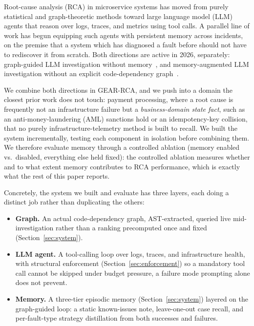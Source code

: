 \documentclass[conference]{IEEEtran}
\begin{document}
Root-cause analysis (RCA) in microservice systems has moved from purely statistical and graph-theoretic methods
toward large language model (LLM) agents that reason over logs, traces, and metrics using tool calls. A parallel
line of work has begun equipping such agents with persistent memory across incidents, on the premise that a
system which has diagnosed a fault before should not have to rediscover it from scratch. Both directions are
active in 2026, separately: graph-guided LLM investigation without memory~\cite{gala}, and memory-augmented LLM
investigation without an explicit code-dependency graph~\cite{amerrcl,opsmem}.

We combine both directions in GEAR-RCA, and we push into a domain the closest prior work does not touch:
payment processing, where a root cause is frequently not an infrastructure failure but a \emph{business-domain
state fact}, such as an anti-money-laundering (AML) sanctions hold or an idempotency-key collision, that no
purely infrastructure-telemetry method is built to recall. We built the system incrementally, testing each
component in isolation before combining them. We therefore evaluate memory through a controlled ablation
(memory enabled vs.\ disabled, everything else held fixed): the controlled ablation measures whether and to
what extent memory contributes to RCA performance, which is exactly what the rest of this paper reports.

Concretely, the system we built and evaluate has three layers, each doing a distinct job rather than
duplicating the others:
\label{sec:intro-arch}

\begin{itemize}
\item \textbf{Graph.} An actual code-dependency graph, AST-extracted, queried live mid-investigation rather than
a ranking precomputed once and fixed (Section~\ref{sec:system}).
\item \textbf{LLM agent.} A tool-calling loop over logs, traces, and infrastructure health, with structural
enforcement (Section~\ref{sec:enforcement}) so a mandatory tool call cannot be skipped under budget pressure, a
failure mode prompting alone does not prevent.
\item \textbf{Memory.} A three-tier episodic memory (Section~\ref{sec:system}) layered on the graph-guided loop:
a static known-issues note, leave-one-out case recall, and per-fault-type strategy distillation from both
successes and failures.
\end{itemize}
\end{document}
